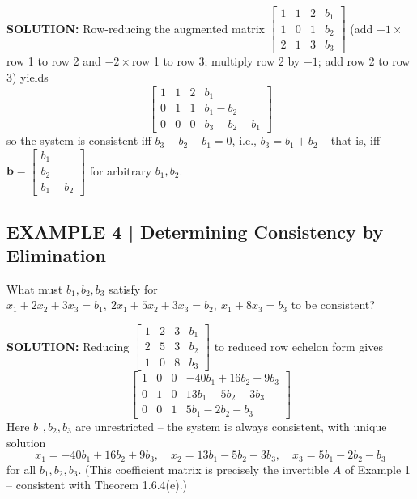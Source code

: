 \documentclass{article}
\theoremstyle{mystyle}
\begin{document}
\textbf{SOLUTION:} Row-reducing the augmented matrix $\begin{bmatrix}1&1&2&b_1\\1&0&1&b_2\\2&1&3&b_3\end{bmatrix}$ (add $-1\times$row 1 to row 2 and $-2\times$row 1 to row 3; multiply row 2 by $-1$; add row 2 to row 3) yields
\[
\begin{bmatrix}1&1&2&b_1\\0&1&1&b_1-b_2\\0&0&0&b_3-b_2-b_1\end{bmatrix}
\]
so the system is consistent iff $b_3-b_2-b_1=0$, i.e., $b_3=b_1+b_2$ -- that is, iff $\mathbf{b}=\begin{bmatrix}b_1\\b_2\\b_1+b_2\end{bmatrix}$ for arbitrary $b_1,b_2$.

\subsection*{EXAMPLE 4 | Determining Consistency by Elimination}
What must $b_1,b_2,b_3$ satisfy for $x_1+2x_2+3x_3=b_1,\ 2x_1+5x_2+3x_3=b_2,\ x_1+8x_3=b_3$ to be consistent?

\textbf{SOLUTION:} Reducing $\begin{bmatrix}1&2&3&b_1\\2&5&3&b_2\\1&0&8&b_3\end{bmatrix}$ to reduced row echelon form gives
\[
\begin{bmatrix}1&0&0&-40b_1+16b_2+9b_3\\0&1&0&13b_1-5b_2-3b_3\\0&0&1&5b_1-2b_2-b_3\end{bmatrix} \tag{2}
\]
Here $b_1,b_2,b_3$ are unrestricted -- the system is always consistent, with unique solution
\[
x_1=-40b_1+16b_2+9b_3,\quad x_2=13b_1-5b_2-3b_3,\quad x_3=5b_1-2b_2-b_3 \tag{3}
\]
for all $b_1,b_2,b_3$. (This coefficient matrix is precisely the invertible $A$ of Example 1 -- consistent with Theorem 1.6.4(e).)
\end{document}
